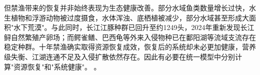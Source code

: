 但禁渔带来的恢复并非始终表现为生态健康改善。部分水域鱼类数量增长过快，水生植物和浮游动物被过度摄食，水体浑浊、底栖植被减少，部分水域甚至形成大面积"水下荒漠"。与此同时，长江江豚种群已回升至约1249头，2024年重新发现长江鲟自然繁殖产卵场；而鳄雀鳝、巴西龟等外来入侵物种已在鄱阳湖等流域支流存在稳定种群。十年禁渔确实取得资源恢复成效，恢复后的系统却未必更加健康，营养级失衡、江湖连通不足及入侵扩散依然存在。因此有必要在统一模型中分别计算"资源恢复"和"系统健康"。
\cite{report2022,report2023}。
